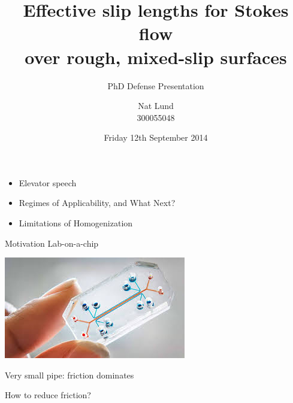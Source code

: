 \documentclass{beamer}
\title{Effective slip lengths for Stokes flow \\ over rough, mixed-slip surfaces}
\subtitle{PhD Defense Presentation}
\author{Nat Lund \\ 300055048}
\institute{Victoria University of Wellington}
\date{Friday 12th September 2014}
\begin{document}
\begin{frame}
\maketitle
\end{frame}


\begin{frame}
\begin{itemize}
\item Elevator speech
\item Regimes of Applicability, and What Next?
\item Limitations of Homogenization
\end{itemize}

\end{frame}

\begin{frame}{Motivation}
Lab-on-a-chip

\begin{center}
\includegraphics[scale=0.5]{lab-on-chip.jpg}
\end{center}

Very small pipe: friction dominates

\vspace{1em}
How to reduce friction?
\end{frame}
\end{document}
